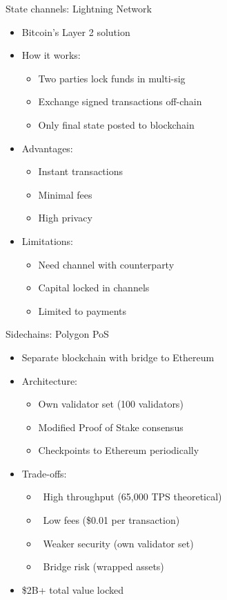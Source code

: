 \documentclass[aspectratio=169, lualatex, handout]{beamer}
\begin{document}
\begin{frame}{State channels: Lightning Network}
	\begin{itemize}
		\item Bitcoin's Layer 2 solution
		\item How it works:
		      \begin{itemize}
			      \item Two parties lock funds in multi-sig
			      \item Exchange signed transactions off-chain
			      \item Only final state posted to blockchain
		      \end{itemize}
		\item Advantages:
		      \begin{itemize}
			      \item Instant transactions
			      \item Minimal fees
			      \item High privacy
		      \end{itemize}
		\item Limitations:
		      \begin{itemize}
			      \item Need channel with counterparty
			      \item Capital locked in channels
			      \item Limited to payments
		      \end{itemize}
	\end{itemize}
\end{frame}

\begin{frame}{Sidechains: Polygon PoS}
	\begin{itemize}
		\item Separate blockchain with bridge to Ethereum
		\item Architecture:
		      \begin{itemize}
			      \item Own validator set (100 validators)
			      \item Modified Proof of Stake consensus
			      \item Checkpoints to Ethereum periodically
		      \end{itemize}
		\item Trade-offs:
		      \begin{itemize}
			      \item \mycheckmark\ High throughput (65,000 TPS theoretical)
			      \item \mycheckmark\ Low fees (\approx\$0.01 per transaction)
			      \item \times\ Weaker security (own validator set)
			      \item \times\ Bridge risk (wrapped assets)
		      \end{itemize}
		\item \$2B+ total value locked
	\end{itemize}
\end{frame}
\end{document}
